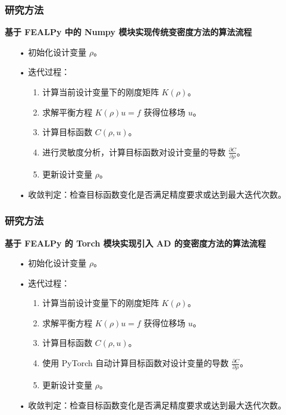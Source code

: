 \documentclass{beamer}
\numberwithin{subsection}{section}
\begin{document}
\begin{frame}
	\frametitle{研究方法}
	 \textbf{基于 FEALPy 中的 Numpy 模块实现传统变密度方法的算法流程}
	 \begin{itemize}
            \item[•]初始化设计变量 $\rho$。
            \item[•]迭代过程：
	        \begin{enumerate}
	            \item[1.]计算当前设计变量下的刚度矩阵 $K(\rho)$。
	            \item[2.]求解平衡方程 $K(\rho) u = f$ 获得位移场 $u$。
	            \item[3.]计算目标函数 $C(\rho, u)$。
	            \item[4.]进行灵敏度分析，计算目标函数对设计变量的导数
	            $\frac{\partial C}{\partial \rho}$。
	            \item[5.]更新设计变量 $\rho$。
	        \end{enumerate}
	        \item[•]收敛判定：检查目标函数变化是否满足精度要求或达到最大迭代次数。
     \end{itemize}
\end{frame}

\begin{frame}
	\frametitle{研究方法}
	 \textbf{基于 FEALPy 的 Torch 模块实现引入 AD 的变密度方法的算法流程}
	 \begin{itemize}
            \item[•]初始化设计变量 $\rho$。
            \item[•]迭代过程：
	        \begin{enumerate}
	            \item[1.]计算当前设计变量下的刚度矩阵 $K(\rho)$。
	            \item[2.]求解平衡方程 $K(\rho) u = f$ 获得位移场 $u$。
	            \item[3.]计算目标函数 $C(\rho, u)$。
	            \item[4.]使用 PyTorch 自动计算目标函数对设计变量的导数 
	            $\frac{\partial C}{\partial \rho}$。
	            \item[5.]更新设计变量 $\rho$。
	        \end{enumerate}
	        \item[•]收敛判定：检查目标函数变化是否满足精度要求或达到最大迭代次数。
     \end{itemize}
\end{frame}
\end{document}
